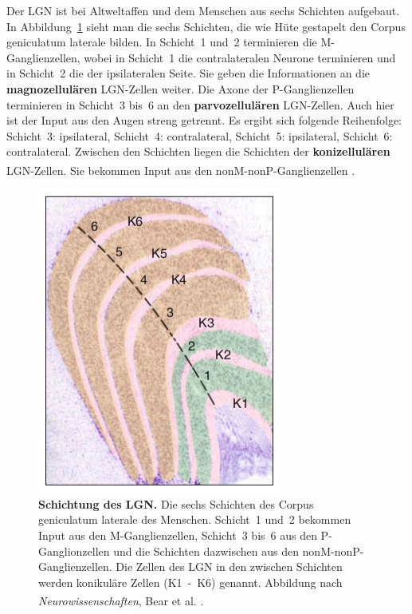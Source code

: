 Der LGN ist bei Altweltaffen und dem Menschen aus sechs Schichten aufgebaut. 
In Abbildung~\ref{fig:schichtung-LGN} sieht man die sechs Schichten, die wie Hüte gestapelt den Corpus geniculatum laterale bilden. In Schicht~1 und~2 terminieren die M-Ganglienzellen, wobei in Schicht~1 die contralateralen Neurone terminieren und in Schicht~2 die der ipsilateralen Seite. Sie geben die Informationen an die \textbf{magnozellulären} LGN-Zellen weiter. Die Axone der P-Ganglienzellen terminieren in Schicht~3 bis~6 an den \textbf{parvozellulären} LGN-Zellen. Auch hier ist der Input aus den Augen streng getrennt. Es ergibt sich folgende Reihenfolge: Schicht~3: ipsilateral, Schicht~4: contralateral, Schicht~5: ipsilateral, Schicht~6: contralateral.
Zwischen den Schichten liegen die Schichten der \textbf{konizellulären} LGN-Zellen. Sie bekommen Input aus den nonM-nonP-Ganglienzellen \textsuperscript{\cite[Kap.~9.7]{heldmaier2003tierphysiologie}}.

\begin{figure}[H]
    \centering
    \includegraphics{pictures/visual/LGN_baer.png}
    \caption[Schichtung des LGN]{\textbf{Schichtung des LGN.} Die sechs Schichten des Corpus geniculatum laterale des Menschen. Schicht~1 und~2 bekommen Input aus den M-Ganglienzellen, Schicht~3 bis~6 aus den P-Ganglionzellen und die Schichten dazwischen aus den nonM-nonP-Ganglienzellen. Die Zellen des LGN in den zwischen Schichten werden konikuläre Zellen (K1~-~K6) genannt. Abbildung nach \textit{Neurowissenschaften}, Bear et al. \textsuperscript{\cite[Kap.~10]{neurowissenschaften_baer}}.}
    \label{fig:schichtung-LGN}
\end{figure} 

